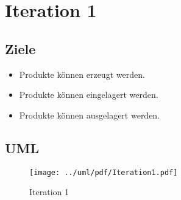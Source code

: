\section{Iteration 1}

\subsection{Ziele}

\begin{itemize}
  \item Produkte k\"onnen erzeugt werden.
  \item Produkte k\"onnen eingelagert werden.
  \item Produkte k\"onnen ausgelagert werden.
\end{itemize}

\subsection{UML}

\begin{figure}
	\centering
		\texttt{[image: ../uml/pdf/Iteration1.pdf]}
	\caption{Iteration 1}
	\label{fig:Iteration1}
\end{figure}
